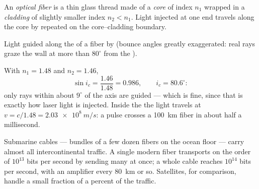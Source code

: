 \begin{definition}\label{def:g10:refraction:fiber}
An \emph{optical fiber} is a thin glass thread made
of a \emph{core} of index $n_1$ wrapped in a
\emph{cladding} of slightly smaller index $n_2 < n_1$.
Light injected at one end travels along the core by repeated  on the core--cladding boundary.
\end{definition}

\begin{omfigure}

{\small Light guided along the  of a fiber by  (bounce angles greatly exaggerated: real rays graze the wall
at more than $80^\circ$ from the ).}
\end{omfigure}

\begin{example}\label{ex:g10:refraction:fibernumbers}
With $n_1 = 1.48$ and $n_2 = 1.46$,
\[
\sin i_c = \frac{1.46}{1.48} = 0.986,
\qquad i_c = 80.6^\circ :
\]
only rays within about $9^\circ$ of the axis are guided --- which is
fine, since that is exactly how laser light is injected. Inside the
 the light travels at $v = c/1.48 = \qty{2.03e8}{m/s}$: a pulse
crosses a \qty{100}{km} fiber in about half a millisecond.
\end{example}

\begin{remark}\label{rem:g10:refraction:datarates}
Submarine cables --- bundles of a few dozen fibers on the ocean floor
--- carry almost all intercontinental traffic. A single modern fiber
transports on the order of $10^{13}$ bits per second by sending many
 at once; a whole cable reaches $10^{14}$ bits per second,
with an amplifier every \qty{80}{km} or so. Satellites, for comparison,
handle a small fraction of a percent of the traffic.
\end{remark}

